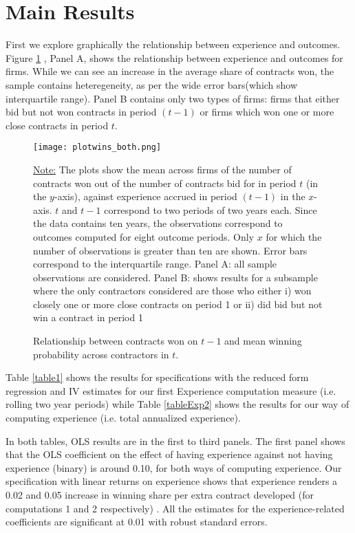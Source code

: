 \section{Main Results}

First we explore graphically the relationship between experience and outcomes. Figure \ref{fig:plotresults_both} , Panel A, shows the relationship between experience and outcomes for firms. While we can see an increase in the average share of contracts won, the sample contains heteregeneity, as per the wide error bars(which show interquartile range). Panel B contains only two types of firms: firms that either bid but not won contracts in period $(t-1)$ or firms which won one or more close contracts in period $t$.

\begin{figure}
  \texttt{[image: plotwins\_both.png]}
  \caption{Relationship between contracts won on $t-1$ and mean winning probability across contractors in $t$.}
  \label{fig:plotresults_both}
  \vskip 0.5mm
  { \footnotesize \underline{Note:} The plots show the mean across firms of the number of contracts won out of the number of contracts bid for in period $t$ (in the $y$-axis), against experience accrued in period $(t-1)$ in the $x$-axis. $t$ and $t-1$ correspond to two periods of two years each. Since the data contains ten years, the observations correspond to outcomes computed for eight outcome periods.  Only $x$ for which the number of observations is greater than ten are shown. Error bars correspond to the interquartile range. Panel A: all sample observations are considered. Panel B:  shows results for a subsample where the only contractors considered are those who either i) won closely one or more close contracts  on period 1 or ii) did bid but not win a contract in period 1\par}
\end{figure}

Table \ref{table1} shows the results for specifications with the reduced form regression and IV estimates for our first Experience computation measure (i.e. rolling two year periods) while Table \ref{tableExp2} shows the results for our way of computing experience (i.e. total annualized experience).

In both tables, OLS results are in the first to third panels. The first panel shows that the OLS coefficient on the effect of having experience against not having experience (binary) is around 0.10, for both ways of computing experience. Our specification with linear returns on experience shows that experience renders a 0.02 and 0.05 increase in winning share per extra contract developed (for computations 1 and 2 respectively) . All the estimates for the experience-related coefficients are significant at 0.01 with robust standard errors.

